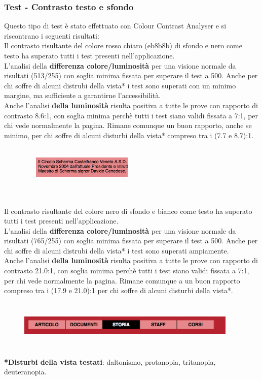 	\subsubsection {Test - Contrasto testo e sfondo}
	Questo tipo di test \`e  stato effettuato con Colour Contrast Analyser e si riscontrano i seguenti risultati:
	\\ Il contrasto risultante del colore rosso chiaro (eb8b8b) di sfondo e nero come testo ha superato tutti i test presenti nell'applicazione.
	\\ L'analisi della \textbf{differenza colore/luminosit\`a} per una visione normale da risultati (513/255) con soglia minima fissata per superare il test a 500. Anche per chi soffre di alcuni distrubi della vista* i test sono superati con un minimo margine, ma sufficiente a garantirne l'accessibilit\`a.
	\\ Anche l'analisi \textbf{della luminosit\`a} risulta positiva a tutte le prove con rapporto di contrasto 8.6:1, con soglia minima perchè tutti i test siano validi fissata a 7:1, per chi vede normalmente la pagina. Rimane comunque un buon rapporto, anche se minimo,  per chi soffre di alcuni disturbi della vista* compreso tra i (7.7 e 8.7):1.
	\\ \\ 
	\begin{figure}[htbp]
	\centering
	\includegraphics[width=60mm, height=10mm]{images/contrasto_testo.png}
	\end{figure}
	\\
	\\Il contrasto risultante del colore nero di sfondo e bianco come testo ha superato tutti i test presenti nell'applicazione.
	\\ L'analisi della \textbf{differenza colore/luminosit\`a} per una visione normale da risultati (765/255) con soglia minima fissata per superare il test a 500. Anche per chi soffre di alcuni distrubi della vista* i test sono superati ampiamente.
	\\ Anche l'analisi \textbf{della luminosit\`a} risulta positiva a tutte le prove con rapporto di contrasto 21.0:1, con soglia minima perchè tutti i test siano validi fissata a 7:1, per chi vede normalmente la pagina. Rimane comunque a un buon rapporto compreso tra i (17.9 e 21.0):1 per chi soffre di alcuni disturbi della vista*.
	\\ \\ 
	\begin{figure}[htbp]
	\centering
	\includegraphics[width=105mm, height=13mm]{images/contrasto_menu.png}
	\end{figure}
	\\ \textbf{*Disturbi della vista testati}: daltonismo, protanopia, tritanopia, deuteranopia.


